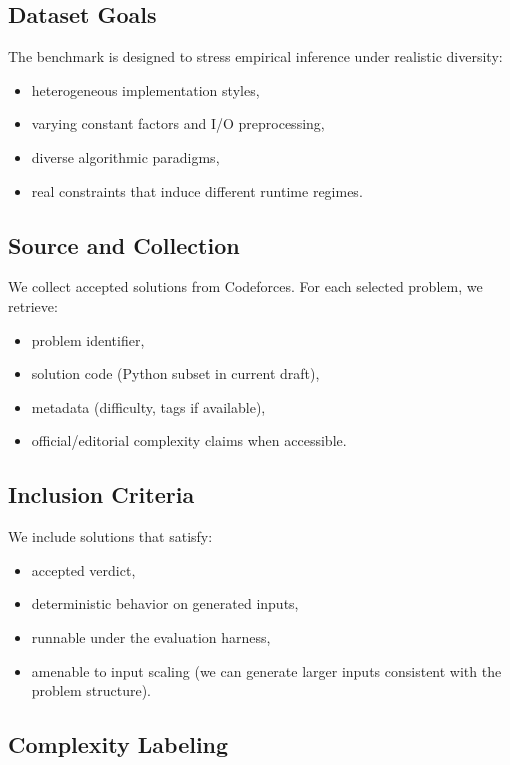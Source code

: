 \documentclass[conference]{IEEEtran}
\begin{document}
\subsection{Dataset Goals}

The benchmark is designed to stress empirical inference under realistic
diversity:
\begin{itemize}[leftmargin=1.2em]
\item heterogeneous implementation styles,
\item varying constant factors and I/O preprocessing,
\item diverse algorithmic paradigms,
\item real constraints that induce different runtime regimes.
\end{itemize}

\subsection{Source and Collection}

We collect accepted solutions from Codeforces.
For each selected problem, we retrieve:
\begin{itemize}[leftmargin=1.2em]
\item problem identifier,
\item solution code (Python subset in current draft),
\item metadata (difficulty, tags if available),
\item official/editorial complexity claims when accessible.
\end{itemize}

\subsection{Inclusion Criteria}

We include solutions that satisfy:
\begin{itemize}[leftmargin=1.2em]
\item accepted verdict,
\item deterministic behavior on generated inputs,
\item runnable under the evaluation harness,
\item amenable to input scaling (we can generate larger inputs consistent with
the problem structure).
\end{itemize}

\subsection{Complexity Labeling}
\end{document}

